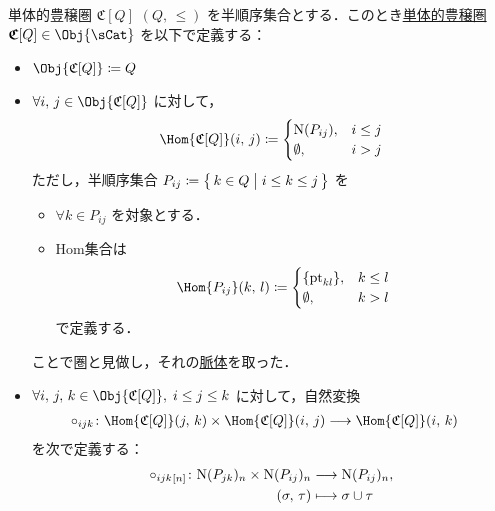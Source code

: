 \documentclass[TQFT_main]{subfiles}
\begin{document}
\begin{mydef}[label=def:PathCat,breakable]{単体的豊穣圏 {$\mathfrak{C}[Q]$}}
$(Q,\, \le)$ を半順序集合とする．このとき\hyperref[def:SimpCat]{単体的豊穣圏} $\bm{\mathfrak{C}}[Q] \in \Obj{\sCat}$ を以下で定義する：
\begin{itemize}
    \item $\Obj{\mathfrak{C}[Q]} \coloneqq Q$
    \item $\forall i,\, j \in \Obj{\mathfrak{C}[Q]}$ に対して，
    \begin{align}
        \Hom{\mathfrak{C}[Q]} (i,\, j) \coloneqq 
        \begin{cases}
            \mathrm{N}(P_{ij}), &i \le j \\
            \emptyset, &i > j
        \end{cases}
    \end{align}
    ただし，半順序集合 $P_{ij} \coloneqq \bigl\{\, k \in Q \bigm| i \le k \le j \,\bigr\}$ を
    \begin{itemize}
        \item $\forall k \in P_{ij}$ を対象とする．
        \item Hom集合は
        \begin{align}
            \Hom{P_{ij}} (k,\, l) \coloneqq 
            \begin{cases}
                \{\mathrm{pt}_{kl}\}, &k \le l \\
                \emptyset, &k > l
            \end{cases}
        \end{align}
        で定義する．
    \end{itemize}
    ことで圏と見做し，それの\hyperref[def:nerve]{脈体}を取った．
    \item $\forall i,\, j,\, k \in \Obj{\mathfrak{C}[Q]},\; i \le j \le k$ に対して，自然変換
    \begin{align}
        \circ_{ijk} \colon \Hom{\mathfrak{C}[Q]}(j,\, k) \times \Hom{\mathfrak{C}[Q]}(i,\, j) &\lto \Hom{\mathfrak{C}[Q]}(i,\, k)
    \end{align}
    を次で定義する：
    \begin{align}
        \circ_{ijk}{}_{[n]} \colon \mathrm{N}(P_{jk})_n \times \mathrm{N}(P_{ij})_n &\longrightarrow \mathrm{N}(P_{ij})_n, \\
        (\sigma,\, \tau) &\longmapsto \sigma \cup \tau
    \end{align}
\end{itemize}    
\end{mydef}
\end{document}
